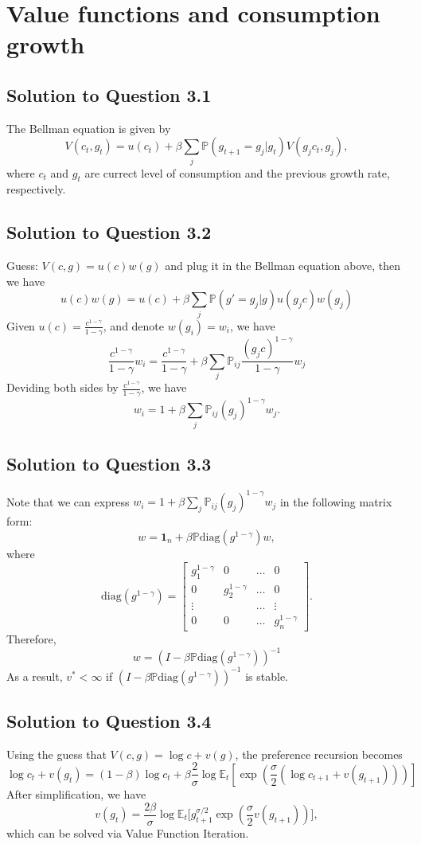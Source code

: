 \documentclass[11pt]{article}
\theoremstyle{definition}
\theoremstyle{boldtitle} %
\numberwithin{equation}{section}
\numberwithin{figure}{section}
\numberwithin{table}{section}
\begin{document}
\section{Value functions and consumption growth}
\subsection*{Solution to Question 3.1}
The Bellman equation is given by 
\[
V(c_t, g_t) = u(c_t) + \beta \sum_{j} \mathbb{P}\left( g_{t+1} = g_j | g_t \right) V(g_j c_t, g_j),
\]
where $c_t$ and $g_t$ are currect level of consumption and the previous growth rate, respectively.

\subsection*{Solution to Question 3.2}
Guess: $V(c, g) = u(c)w(g)$ and plug it in the Bellman equation above, then we have
\[
u(c)w(g) = u(c) + \beta \sum_{j} \mathbb{P}\left( g' = g_j | g \right) u(g_jc) w(g_j)
\]
Given $u(c) = \frac{c^{1 - \gamma}}{1 - \gamma}$, and denote $w(g_i) = w_i$, we have 
\[
\frac{c^{1 - \gamma}}{1 - \gamma} w_i = \frac{c^{1 - \gamma}}{1 - \gamma} + \beta \sum_j \mathbb{P}_{ij} \frac{(g_jc)^{1 - \gamma}}{1 - \gamma} w_j 
\]
Deviding both sides by $\frac{c^{1 - \gamma}}{1 - \gamma}$, we have 
\[
w_i = 1 + \beta \sum_j \mathbb{P}_{ij}(g_j)^{1 - \gamma} w_j.
\]

\subsection*{Solution to Question 3.3}
Note that we can express $w_i = 1 + \beta \sum_j \mathbb{P}_{ij}(g_j)^{1 - \gamma} w_j$ in the following matrix form:
\[
w = \bm{1}_n + \beta \mathbb{P} \text{diag}(g^{1-\gamma}) w,
\]
where 
\[
\text{diag}(g^{1-\gamma}) = \begin{bmatrix}
    g_1^{1-\gamma} & 0 & \dots & 0 \\ 
    0 & g_2^{1-\gamma} & \dots & 0 \\ 
    \vdots & & \dots & \vdots \\
    0 & 0 & \dots & g_n^{1-\gamma} 
\end{bmatrix}.
\]
Therefore, 
\[
w = \left( I - \beta \mathbb{P}\text{diag}(g^{1-\gamma})\right)^{-1}
\]
As a result, $v^* < \infty$ if $ \left( I - \beta \mathbb{P}\text{diag}(g^{1-\gamma})\right)^{-1}$ is stable.


\subsection*{Solution to Question 3.4}
Using the guess that $V(c, g) = \log c + v(g)$, the preference recursion becomes 
\[
\log c_t + v(g_t) = (1 - \beta) \log c_t + 
\beta \frac{2}{\sigma} \log \mathbb{E}_t \left[ \exp \left(\frac{\sigma}{2} (\log c_{t+1} + v(g_{t+1})) \right) \right]
\]
After simplification, we have 
\[
v(g_t) = \frac{2\beta}{\sigma} \log \mathbb{E}_t \bigg[g_{t+1}^{\sigma/2} \exp(\frac{\sigma}{2}v(g_{t+1})) \bigg],
\]
which can be solved via Value Function Iteration.
\end{document}

